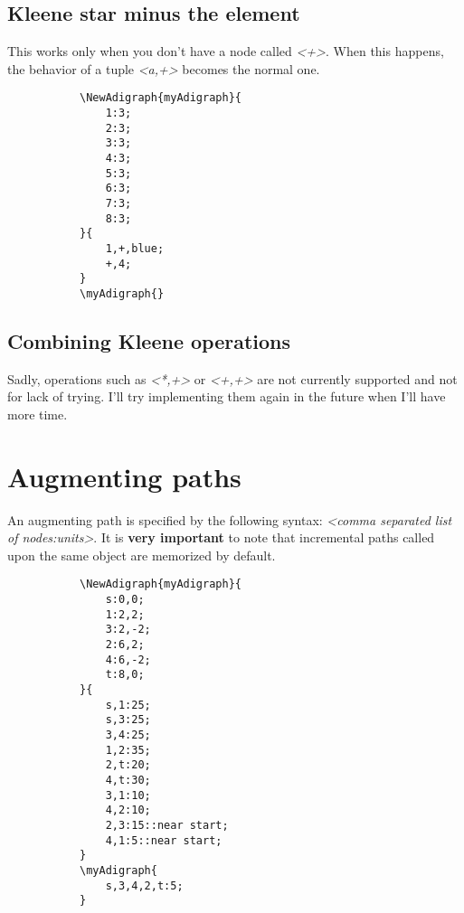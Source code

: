 \documentclass{report}
\begin{document}
\subsection{Kleene star minus the element}
This works only when you don't have a node called \textit{<+>}. When this happens, the behavior of a tuple \textit{<a,+>} becomes the normal one.
\begin{figure}
	\begin{subfigure}{0.49\textwidth}
		\begin{verbatim}
\NewAdigraph{myAdigraph}{
	1:3;
	2:3;
	3:3;
	4:3;
	5:3;
	6:3;
	7:3;
	8:3;
}{
	1,+,blue;
	+,4;
}
\myAdigraph{}
\end{verbatim}
	\end{subfigure}
	\begin{subfigure}{0.49\textwidth}
		\myAdigraph{}
	\end{subfigure}
\end{figure}


\subsection{Combining Kleene operations}
Sadly, operations such as \textit{<*,+>} or \textit{<+,+>} are not currently supported and not for lack of trying. I'll try implementing them again in the future when I'll have more time.

\section{Augmenting paths}
An augmenting path is specified by the following syntax: \textit{<comma separated list of nodes:units>}. It is \textbf{very important} to note that incremental paths called upon the same object are memorized by default.


\begin{figure}
	\begin{subfigure}{0.49\textwidth}
		\begin{verbatim}
\NewAdigraph{myAdigraph}{
	s:0,0;
	1:2,2;
	3:2,-2;
	2:6,2;
	4:6,-2;
	t:8,0;
}{
	s,1:25;
	s,3:25;
	3,4:25;
	1,2:35;
	2,t:20;
	4,t:30;
	3,1:10;
	4,2:10;
	2,3:15::near start;
	4,1:5::near start;
}
\myAdigraph{
	s,3,4,2,t:5;
}
\end{verbatim}
	\end{subfigure}
	\begin{subfigure}{0.49\textwidth}
	\end{subfigure}
\end{figure}
\end{document}
